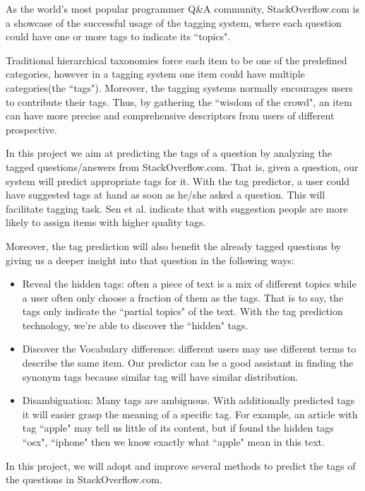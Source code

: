 
As the world's most popular programmer Q\&A community, StackOverflow.com is a showcase of the successful usage of the tagging system, where each question could have one or more tags to indicate its ``topics". 

Traditional hierarchical taxonomies force each item to be one of the predefined categories, however in a tagging system one item could have multiple categories(the ``tags"). Moreover, the tagging systems normally encourages users to contribute their tags. Thus, by gathering the ``wisdom of the crowd", an item can have more precise and comprehensive descriptors from users of different prospective. 

In this project we aim at predicting the tags of a question by analyzing the tagged questions/answers from StackOverflow.com. That is, given a question, our system will predict appropriate tags for it. With the tag predictor, a user could have suggested tags at hand as soon as he/she asked a question. This will facilitate tagging task. Sen et al.\cite{Sen2006} indicate that with suggestion people are more likely to assign items with higher quality tags.

Moreover, the tag prediction will also benefit the already tagged questions by giving us a deeper insight into that question in the following ways:

\begin{itemize}
    \item Reveal the hidden tags: often a piece of text is a mix of different topics while a user often only choose a fraction of them as the tags. That is to say, the tags only indicate the ``partial topics" of the text. With the tag prediction technology, we're able to discover the ``hidden" tags.
    \item Discover the Vocabulary difference: different users may use different terms to describe the same item. Our predictor can be a good assistant in finding the synonym tags because similar tag will have similar distribution.
    \item Disambiguation: Many tags are ambiguous. With additionally predicted tags it will easier grasp the meaning of a specific tag. For example, an article with tag ``apple" may tell us little of its content, but if found the hidden tags ``osx", ``iphone" then we know exactly what ``apple" mean in this text.
\end{itemize}

In this project, we will adopt and improve several methods to predict the tags of the questions in StackOverflow.com.
